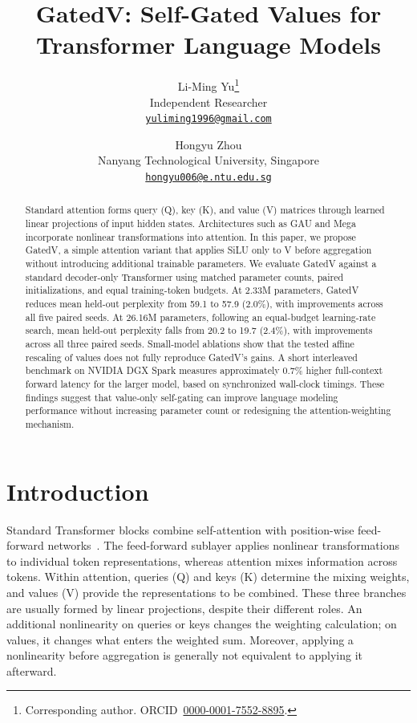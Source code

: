 \documentclass[11pt,a4paper]{article}
\title{GatedV: Self-Gated Values for Transformer Language Models}
\author{
  Li-Ming Yu\thanks{Corresponding author. ORCID~\href{https://orcid.org/0000-0001-7552-8895}{0000-0001-7552-8895}.}\\
  Independent Researcher\\
  {\small\href{mailto:yuliming1996@gmail.com}{\texttt{yuliming1996@gmail.com}}}
  \and
  Hongyu Zhou\\
  Nanyang Technological University, Singapore\\
  {\small\href{mailto:hongyu006@e.ntu.edu.sg}{\texttt{hongyu006@e.ntu.edu.sg}}}
}
\begin{document}
\maketitle
\begin{abstract}

Standard attention forms query (Q), key (K), and value (V) matrices through learned linear projections of input hidden states. Architectures such as GAU and Mega incorporate nonlinear transformations into attention. In this paper, we propose GatedV, a simple attention variant that applies SiLU only to V before aggregation without introducing additional trainable parameters. We evaluate GatedV against a standard decoder-only Transformer using matched parameter counts, paired initializations, and equal training-token budgets. At 2.33M parameters, GatedV reduces mean held-out perplexity from 59.1 to 57.9 (2.0\%), with improvements across all five paired seeds. At 26.16M parameters, following an equal-budget learning-rate search, mean held-out perplexity falls from 20.2 to 19.7 (2.4\%), with improvements across all three paired seeds. Small-model ablations show that the tested affine rescaling of values does not fully reproduce GatedV's gains. A short interleaved benchmark on NVIDIA DGX Spark measures approximately 0.7\% higher full-context forward latency for the larger model, based on synchronized wall-clock timings. These findings suggest that value-only self-gating can improve language modeling performance without increasing parameter count or redesigning the attention-weighting mechanism.
\end{abstract}

\section{Introduction}

Standard Transformer blocks combine self-attention with position-wise feed-forward networks~\citep{transformer}. The feed-forward sublayer applies nonlinear transformations to individual token representations, whereas attention mixes information across tokens. Within attention, queries (Q) and keys (K) determine the mixing weights, and values (V) provide the representations to be combined. These three branches are usually formed by linear projections, despite their different roles. An additional nonlinearity on queries or keys changes the weighting calculation; on values, it changes what enters the weighted sum. Moreover, applying a nonlinearity before aggregation is generally not equivalent to applying it afterward.
\end{document}
